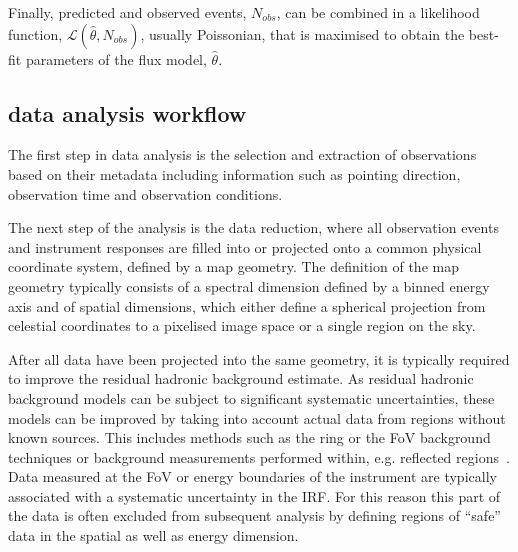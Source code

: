 \documentclass[longauth]{aa}
\begin{document}

Finally, predicted and observed events, $N_{obs}$, can be combined in a likelihood function,
$\mathcal{L}(\hat{\theta}, N_{obs})$, usually Poissonian, that is maximised to obtain the best-fit parameters of the flux model, $\hat{\theta}$.

\subsection{\gammapy data analysis workflow}
The first step in \gammaray data analysis is the selection and extraction of observations
based on their metadata including information such as pointing direction, observation
time and observation conditions. 

The next step of the analysis is the data reduction, where all observation events and instrument
responses are filled into or projected onto a common physical coordinate system, defined by
a map geometry. The definition of the map geometry typically consists of a spectral dimension
defined by a binned energy axis and of spatial dimensions, which either define 
a spherical projection from celestial coordinates to a pixelised image space
or a single region on the sky.

After all data have been projected into the same geometry, it is typically
required to improve the residual hadronic background estimate. As residual hadronic
background models can be subject to significant systematic uncertainties,
these models can be improved by taking into account actual data
from regions without known \gammaray sources. This includes methods 
such as the ring or the FoV background techniques or
background measurements performed within, e.g. reflected regions~\citep{Berge07}.
Data measured at the FoV or energy boundaries of the instrument are typically
associated with a systematic uncertainty in the IRF. For this reason this part 
of the data is often excluded from subsequent analysis by defining regions of
 \enquote{safe} data in the spatial as well as energy dimension.
\end{document}
